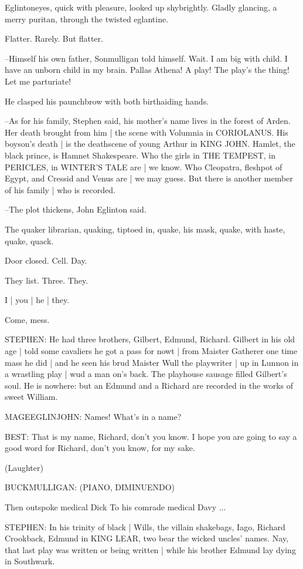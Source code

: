 Eglintoneyes,
quick with pleasure,
looked up shybrightly.
Gladly glancing,
a merry puritan,
through the twisted eglantine.

Flatter.
Rarely.
But flatter.

--Himself his own father,
Sonmulligan told himself.
Wait.
I am big with child.
I have an unborn child in my brain.
Pallas Athena!
A play!
The play's the thing!
Let me parturiate!

He clasped his paunchbrow with both birthaiding hands.

--As for his family,
Stephen said,
his mother's name lives in the forest of Arden.
Her death brought from him |
the scene with Volumnia in CORIOLANUS.
His boyson's death |
is the deathscene of young Arthur in KING JOHN.
Hamlet, the black prince,
is Hamnet Shakespeare.
Who the girls in THE TEMPEST,
in PERICLES,
in WINTER'S TALE are |
we know.
Who Cleopatra,
fleshpot of Egypt,
and Cressid and Venus are |
we may guess.
But there is another member of his family |
who is recorded.

--The plot thickens,
John Eglinton said.

The quaker librarian,
quaking,
tiptoed in,
quake,
his mask,
quake,
with haste,
quake,
quack.

Door closed.
Cell.
Day.

They list.
Three.
They.

I |
you |
he |
they.

Come,
mess.

STEPHEN:
He had three brothers,
Gilbert,
Edmund,
Richard.
Gilbert in his old age |
told some cavaliers he got a pass for nowt |
from Maister Gatherer one time mass he did |
and he seen his brud Maister Wull the playwriter |
up in Lunnon in a wrastling play |
wud a man on's back.
The playhouse sausage filled Gilbert's soul.
He is nowhere:
but an Edmund and a Richard are recorded in the works of sweet William.

MAGEEGLINJOHN:
Names!
What's in a name?

BEST:
That is my name,
Richard,
don't you know.
I hope you are going to say a good word for Richard,
don't you know,
for my sake.

                (Laughter)

BUCKMULLIGAN:
(PIANO, DIMINUENDO)

         Then outspoke medical Dick
         To his comrade medical Davy ...

STEPHEN:
In his trinity of black |
Wills,
the villain shakebags,
Iago,
Richard Crookback,
Edmund in KING LEAR,
two bear the wicked uncles' names.
Nay,
that last play was written or being written |
while his brother Edmund lay dying in Southwark.

